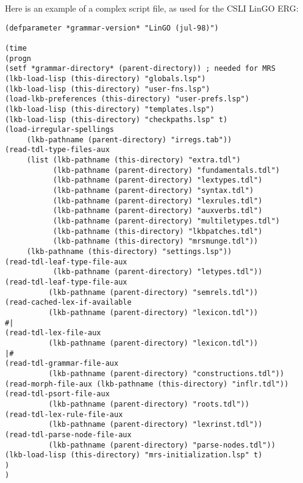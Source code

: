 \documentclass[12pt]{report}
\begin{document}
Here is an example of a complex script file, as used for
the CSLI LinGO ERG:
\begin{verbatim}
(defparameter *grammar-version* "LinGO (jul-98)")

(time
(progn
(setf *grammar-directory* (parent-directory)) ; needed for MRS
(lkb-load-lisp (this-directory) "globals.lsp")
(lkb-load-lisp (this-directory) "user-fns.lsp")
(load-lkb-preferences (this-directory) "user-prefs.lsp")
(lkb-load-lisp (this-directory) "templates.lsp")
(lkb-load-lisp (this-directory) "checkpaths.lsp" t)
(load-irregular-spellings 
     (lkb-pathname (parent-directory) "irregs.tab"))
(read-tdl-type-files-aux
     (list (lkb-pathname (this-directory) "extra.tdl")
           (lkb-pathname (parent-directory) "fundamentals.tdl")
           (lkb-pathname (parent-directory) "lextypes.tdl")
           (lkb-pathname (parent-directory) "syntax.tdl")
           (lkb-pathname (parent-directory) "lexrules.tdl")
           (lkb-pathname (parent-directory) "auxverbs.tdl")
           (lkb-pathname (parent-directory) "multiletypes.tdl")
           (lkb-pathname (this-directory) "lkbpatches.tdl")
           (lkb-pathname (this-directory) "mrsmunge.tdl"))
     (lkb-pathname (this-directory) "settings.lsp"))
(read-tdl-leaf-type-file-aux
           (lkb-pathname (parent-directory) "letypes.tdl"))
(read-tdl-leaf-type-file-aux
          (lkb-pathname (parent-directory) "semrels.tdl"))
(read-cached-lex-if-available 
          (lkb-pathname (parent-directory) "lexicon.tdl"))
#|
(read-tdl-lex-file-aux 
          (lkb-pathname (parent-directory) "lexicon.tdl"))
|#
(read-tdl-grammar-file-aux 
          (lkb-pathname (parent-directory) "constructions.tdl"))
(read-morph-file-aux (lkb-pathname (this-directory) "inflr.tdl"))
(read-tdl-psort-file-aux 
          (lkb-pathname (parent-directory) "roots.tdl"))
(read-tdl-lex-rule-file-aux 
          (lkb-pathname (parent-directory) "lexrinst.tdl"))
(read-tdl-parse-node-file-aux 
          (lkb-pathname (parent-directory) "parse-nodes.tdl"))
(lkb-load-lisp (this-directory) "mrs-initialization.lsp" t)
)
)
\end{verbatim}
\end{document}
